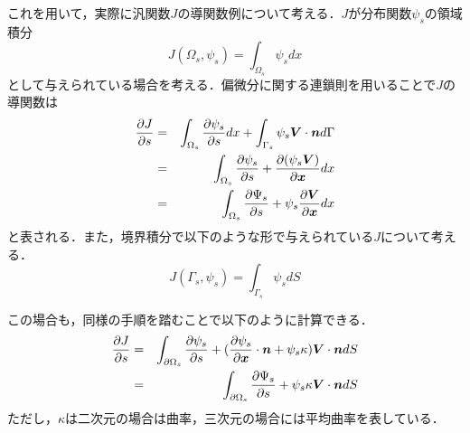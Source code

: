 これを用いて，実際に汎関数$ J $の導関数例について考える．$ J $が分布関数$ \psi_s $の領域積分
\begin{equation}\label{eq:AreaIntegral}
	J(\Omega_s,\psi_s) = \int_{\Omega_s} \psi_s dx
\end{equation}
として与えられている場合を考える．偏微分に関する連鎖則を用いることで$ J $の導関数は
\begin{eqnarray}\label{eq:J_Div}
	\frac{\partial J}{\partial s} &=&\int_{\Omega_s} \frac{\partial \psi_s}{\partial s} dx + \int_{\Gamma_s} \psi_s {\mbox{\boldmath $V$}} \cdot {\mbox{\boldmath $n$}} d\Gamma \\
	&=& \int_{\Omega_s} \frac{\partial \psi_s}{\partial s}  + \frac{\partial (\psi_s {\mbox{\boldmath $V$}})}{\partial {\mbox{\boldmath $x$}}} dx \\
	&=& \int_{\Omega_s} \frac{\partial \Psi_s}{\partial s}  + \psi_s \frac{\partial {\mbox{\boldmath $V$}}}{\partial {\mbox{\boldmath $x$}}} dx 
\end{eqnarray}
と表される．また，境界積分で以下のような形で与えられている$ J $について考える．
\begin{equation}\label{eq:BoundaryIntegral}
	J(\Gamma_s,\psi_s) = \int_{\Gamma_s} \psi_s dS
\end{equation}

この場合も，同様の手順を踏むことで以下のように計算できる．
\begin{eqnarray}\label{eq:J_Div2}
\frac{\partial J}{\partial s} &=&\int_{\partial \Omega_s} \frac{\partial \psi_s}{\partial s} + (\frac{\partial \psi_s}{\partial {\mbox{\boldmath $x$}}} \cdot {\mbox{\boldmath $n$}}+\psi_s \kappa ){\mbox{\boldmath $V$}} \cdot {\mbox{\boldmath $n$}} dS \\
&=& \int_{\partial \Omega_s} \frac{\partial \Psi_s}{\partial s} + \psi_s \kappa {\mbox{\boldmath $V$}} \cdot {\mbox{\boldmath $n$}} dS
\end{eqnarray}
ただし，$ \kappa $は二次元の場合は曲率，三次元の場合には平均曲率を表している．


